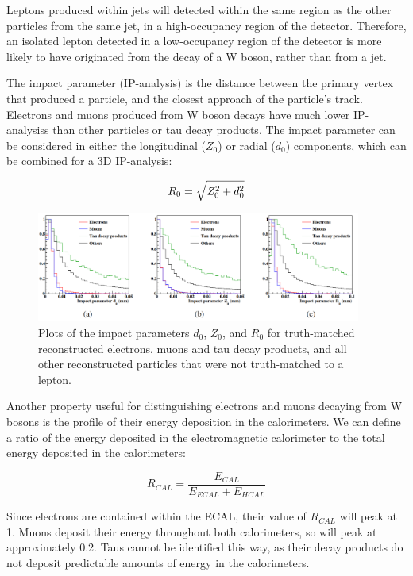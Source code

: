 Leptons produced within jets will detected within the same region as the other particles from the same jet, in a high-occupancy region of the detector. Therefore, an isolated lepton detected in a low-occupancy region of the detector is more likely to have originated from the decay of a W boson, rather than from a jet.

The impact parameter (\acrshort{IP-analysis}) is the distance between the primary vertex that produced a particle, and the closest approach of the particle's track. Electrons and muons produced from W boson decays have much lower \acrshort{IP-analysis}s than other particles or tau decay products. The impact parameter can be considered in either the longitudinal ($Z_0$) or radial ($d_0$) components, which can be combined for a 3D \acrshort{IP-analysis}:

\begin{equation}
	\centering
	R_0 = \sqrt{Z_0^2 + d_0^2}
\label{eq:impact-parameter}
\end{equation}

\begin{figure}[p]
	\centering
	\includegraphics[width=0.95\textwidth]{../Pictures/Analysis/impact-parameter.png}
	\caption{Plots of the impact parameters $d_0$, $Z_0$, and $R_0$ for truth-matched reconstructed electrons, muons and tau decay products, and all other reconstructed particles that were not truth-matched to a lepton.}
	\label{figure:analysis/leptons/impact-parameter}
\end{figure}

Another property useful for distinguishing electrons and muons decaying from W bosons is the profile of their energy deposition in the calorimeters. We can define a ratio of the energy deposited in the electromagnetic calorimeter to the total energy deposited in the calorimeters:

\begin{equation}
	R_{CAL} = \frac{E_{CAL}}{E_{ECAL} + E_{HCAL}}
\label{eq:calorimeter-ratio}
\end{equation}

Since electrons are contained within the \acrshort{ECAL}, their value of $R_{CAL}$ will peak at 1. Muons deposit their energy throughout both calorimeters, so will peak at approximately 0.2. Taus cannot be identified this way, as their decay products do not deposit predictable amounts of energy in the calorimeters.

